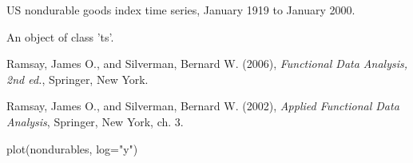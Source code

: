 \documentclass{article}
\begin{document}
\begin{Description}\relax
US nondurable goods index time series, January 1919 to January 2000.
\end{Description}
\begin{Format}\relax
An object of class 'ts'.
\end{Format}
\begin{Source}\relax
Ramsay, James O., and Silverman, Bernard W. (2006), \emph{Functional
Data Analysis, 2nd ed.}, Springer, New York. 

Ramsay, James O., and Silverman, Bernard W. (2002), \emph{Applied
Functional Data Analysis}, Springer, New York, ch. 3.
\end{Source}
\begin{Examples}
\begin{ExampleCode}
plot(nondurables, log="y")
\end{ExampleCode}
\end{Examples}
\end{document}
